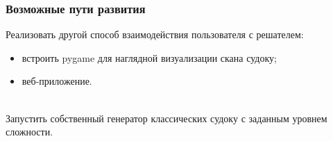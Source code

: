 \documentclass{beamer}
\begin{document}
\begin{frame}
\frametitle{Возможные пути развития}
Реализовать другой способ взаимодействия пользователя с решателем:
\begin{itemize}
	\item встроить pygame для наглядной визуализации скана судоку;
	\item веб-приложение.
\end{itemize}
\ \\
Запустить собственный генератор классических судоку с заданным уровнем сложности.
\end{frame}
\end{document}
